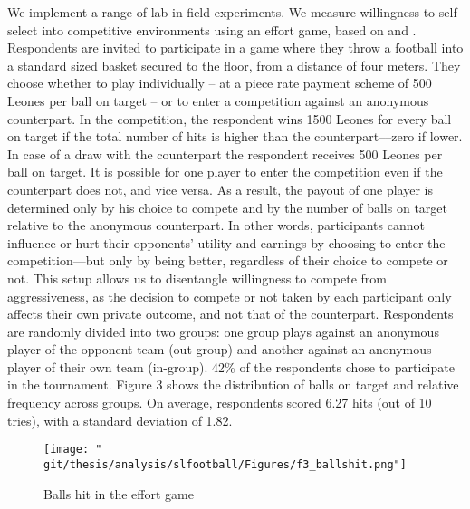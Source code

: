 We implement a range of lab-in-field experiments. We measure willingness to self-select into competitive environments using an effort game, based on \cite{Niederle2007} and \cite{Bartling2009b}. Respondents are invited to participate in a game where they throw a football into a standard sized basket secured to the floor, from a distance of four meters. They choose whether to play individually – at a piece rate payment scheme of 500 Leones per ball on target – or to enter a competition against an anonymous counterpart. In the competition, the respondent wins 1500 Leones for every ball on target if the total number of hits is higher than the counterpart––zero if lower.   In case of a draw with the counterpart the respondent receives 500 Leones per ball on target. It is possible for one player to enter the competition even if the counterpart does not, and vice versa. As a result, the payout of one player is determined only by his choice to compete and by the number of balls on target relative to the anonymous counterpart.  In other words, participants cannot influence or hurt their opponents’ utility and earnings by choosing to enter the competition—but only by being better, regardless of their choice to compete or not. This setup allows us to disentangle willingness to compete from aggressiveness, as the decision to compete or not taken by each participant only affects their own private outcome, and not that of the counterpart. Respondents are randomly divided into two groups: one group plays against an anonymous player of the opponent team (out-group) and another against an anonymous player of their own team (in-group). 42\% of the respondents chose to participate in the tournament. Figure 3 shows the distribution of balls on target and relative frequency across groups. On average, respondents scored 6.27 hits (out of 10 tries), with a standard deviation of 1.82.  

\begin{figure}[htb]
  \texttt{[image: "\\git/thesis/analysis/slfootball/Figures/f3\_ballshit.png"]}
  \caption{Balls hit in the effort game}
  \label{fig:slf:ballshit}
\end{figure}

